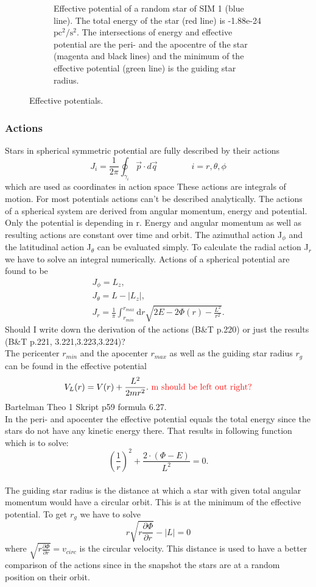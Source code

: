 \begin{figure}[htbp]
\begin{subfigure}{0.475\textwidth}
	\caption{Effective potential of a random star of SIM 1 (blue line). The total energy of the star (red line) is -1.88e-24 \(\mathrm{pc}^2/\mathrm{s}^2\). The intersections of energy and effective potential are the peri- and the apocentre of the star (magenta and black lines) and the minimum of the effective potential (green line) is the guiding star radius.}
	\label{pot_eff_theory_part}
	\end{subfigure}
\caption{Effective potentials.}
\label{fig:pot_eff_theory}
\end{figure}
\subsubsection{Actions}
Stars in spherical symmetric potential are fully described by their actions \begin{equation}
J_i=\frac{1}{2\pi}\oint_{\gamma_i}\vec{p}\cdot d\vec{q} \qquad\qquad i=r,\theta,\phi
\end{equation} which are used as coordinates in action space
These actions are integrals of motion. For most potentials actions can't be described analytically. The actions of a spherical system are derived from angular momentum, energy and potential. Only the potential is depending in r. Energy and angular momentum as well as resulting actions are constant over time and orbit. The azimuthal action J\(_\phi\) and the latitudinal action J\(_\theta\) can be evaluated simply. To calculate the radial action J\(_r\) we have to solve an integral numerically. Actions of a spherical potential are found to be \begin{align}
J_\phi=L_z, \\ J_\theta=L-|L_z|, \\ J_r=\frac{1}{\pi} \int_{r_{min}}^{r_{max}} \mathrm{d}r \sqrt{2E-2\Phi(r)-\frac{L^2}{r^2}}.
\end{align}\color{red} Should I write down the derivation of the actions (B\&T p.220) or just the results (B\&T p.221, 3.221,3.223,3.224)?\color{black} \\ The pericenter \(r_{min}\) and the apocenter \(r_{max}\) as well as the guiding star radius \(r_g\) can be found in the effective potential \begin{equation}
V_L(r)=V(r)+\frac{L^2}{2mr^2}.\  \color{red} \mathrm{m\ should\ be\ left\ out\ right?} \color{black}
\end{equation} \color{red} Bartelman Theo 1 Skript p59 formula 6.27. \\ \color{black} In the peri- and apocenter the effective potential equals the total energy since the stars do not have any kinetic energy there. That results in following function which is to solve: \[\left(\frac{1}{r}\right)^2+\frac{2\cdot (\Phi-E)}{L^2}=0.\] \\ The guiding star radius is the distance at which a star with given total angular momentum would have a circular orbit. This is at the minimum of the effective potential. To get \(r_g\) we have to solve \[r\sqrt{r\frac{\partial\Phi}{\partial r}}-|L|=0\] where \(\sqrt{r\frac{\partial\Phi}{\partial r}}=v_{circ}\) is the circular velocity. This distance is used to have a better comparison of the actions since in the snapshot the stars are at a random position on their orbit.
